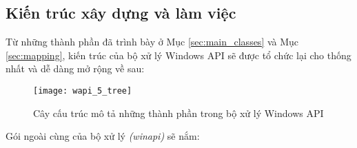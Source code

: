 	\subsection{Kiến trúc xây dựng và làm việc}

Từ những thành phần đã trình bày ở Mục \ref{sec:main_classes} và Mục \ref{sec:mapping}, kiến trúc của bộ xử lý Windows API sẽ được tổ chức lại cho thống nhất và dễ dàng mở rộng về sau:

	\begin{figure}[H]
	\centering
		\texttt{[image: wapi\_5\_tree]}
		\caption{Cây cấu trúc mô tả những thành phần trong bộ xử lý Windows API}	
		\label{fig:wapi_5_tree}		
	\end{figure}

Gói ngoài cùng của bộ xử lý \textit{(winapi)} sẽ nắm:

